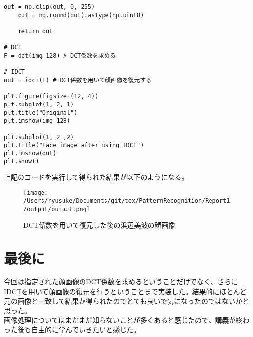 \documentclass[dvipdfmx,uplatex]{jsarticle}
\begin{document}
\begin{spacing}{1.4}
\begin{lstlisting}[caption=DCT係数を元に画像を復元するソースコード]
    out = np.clip(out, 0, 255)
    out = np.round(out).astype(np.uint8)

    return out

# DCT
F = dct(img_128) # DCT係数を求める

# IDCT
out = idct(F) # DCT係数を用いて顔画像を復元する

plt.figure(figsize=(12, 4))
plt.subplot(1, 2, 1)
plt.title("Original")
plt.imshow(img_128)

plt.subplot(1, 2 ,2)
plt.title("Face image after using IDCT")
plt.imshow(out)
plt.show()
\end{lstlisting}

上記のコードを実行して得られた結果が以下のようになる。\\
\begin{figure}[htbp]
\begin{center}
\texttt{[image: /Users/ryusuke/Documents/git/tex/PatternRecognition/Report1/output/output.png]}
\caption{DCT係数を用いて復元した後の浜辺美波の顔画像}
\end{center}
\end{figure}

\newpage

\section{最後に}
今回は指定された顔画像のDCT係数を求めるということだけでなく、さらにIDCTを用いて顔画像の復元を行うということまで実装した。結果的にほとんど元の画像と一致して結果が得られたのでとても良いで気になったのではないかと思った。\\
画像処理についてはまだまだ知らないことが多くあると感じたので、講義が終わった後も自主的に学んでいきたいと感じた。

\end{spacing}
\end{document}
